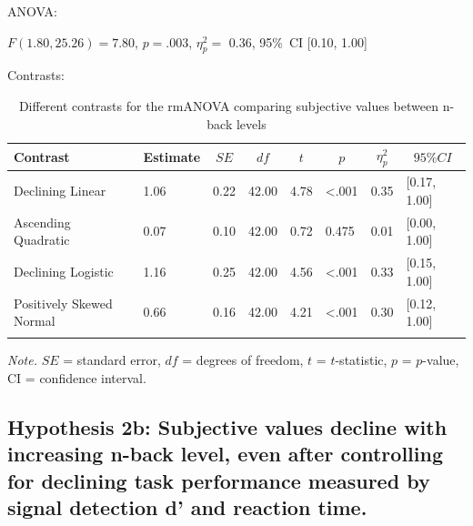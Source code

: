 \documentclass[
  man,floatsintext]{apa6}
\begin{document}
ANOVA:

\(F(1.80, 25.26) = 7.80\), \(p = .003\), \(\eta_{p}^{2}=\) 0.36, 95\%~CI {[}0.10, 1.00{]}

Contrasts:

\begin{table}[H]

\begin{center}
\begin{threeparttable}

\caption{\label{tab:unnamed-chunk-8}Different contrasts for the rmANOVA comparing subjective values between n-back levels}

\begin{tabular}{llllllll}
\toprule
Contrast & \multicolumn{1}{c}{Estimate} & \multicolumn{1}{c}{$SE$} & \multicolumn{1}{c}{$df$} & \multicolumn{1}{c}{$t$} & \multicolumn{1}{c}{$p$} & \multicolumn{1}{c}{$\eta_{p}^{2}$} & \multicolumn{1}{c}{$95\% CI$}\\
\midrule
Declining Linear & 1.06 & 0.22 & 42.00 & 4.78 & <.001 & 0.35 & {}[0.17, 1.00]\\
Ascending Quadratic & 0.07 & 0.10 & 42.00 & 0.72 & 0.475 & 0.01 & {}[0.00, 1.00]\\
Declining Logistic & 1.16 & 0.25 & 42.00 & 4.56 & <.001 & 0.33 & {}[0.15, 1.00]\\
Positively Skewed Normal & 0.66 & 0.16 & 42.00 & 4.21 & <.001 & 0.30 & {}[0.12, 1.00]\\
\bottomrule
\addlinespace
\end{tabular}

\begin{tablenotes}[para]
\normalsize{\textit{Note.} $SE$ = standard error, $df$ = degrees of freedom, $t$ = $t$-statistic, $p$ = $p$-value, CI = confidence interval.}
\end{tablenotes}

\end{threeparttable}
\end{center}

\end{table}

\newpage

\hypertarget{hypothesis-2b-subjective-values-decline-with-increasing-n-back-level-even-after-controlling-for-declining-task-performance-measured-by-signal-detection-d-and-reaction-time.}{%
\subsection{Hypothesis 2b: Subjective values decline with increasing n-back level, even after controlling for declining task performance measured by signal detection d' and reaction time.}\label{hypothesis-2b-subjective-values-decline-with-increasing-n-back-level-even-after-controlling-for-declining-task-performance-measured-by-signal-detection-d-and-reaction-time.}}
\end{document}
